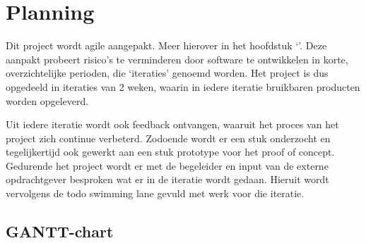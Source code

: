 
\chapter{Planning}
Dit project wordt agile aangepakt. Meer hierover in het hoofdstuk ‘’. Deze aanpakt probeert risico's te verminderen door software te ontwikkelen in korte, overzichtelijke perioden, die ‘iteraties’ genoemd worden. Het project is dus opgedeeld in iteraties van 2 weken, waarin in iedere iteratie bruikbaren producten worden opgeleverd.\par

Uit iedere iteratie wordt ook feedback ontvangen, waaruit het proces van het project zich continue verbeterd. Zodoende wordt er een stuk onderzocht en tegelijkertijd ook gewerkt aan een stuk prototype voor het proof of concept. Gedurende het project wordt er met de begeleider en input van de externe opdrachtgever besproken wat er in de iteratie wordt gedaan. Hieruit wordt vervolgens de todo swimming lane gevuld met werk voor die iteratie.

\section{GANTT-chart}


